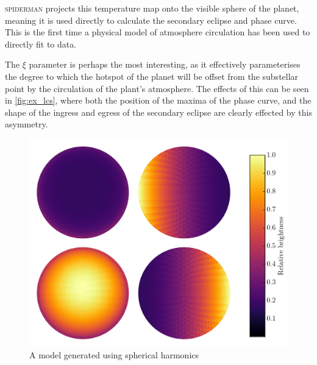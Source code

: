 \documentclass[a4paper,fleqn,usenatbib]{mnras}
\begin{document}
\textsc{spiderman} projects this temperature map onto the visible sphere of the planet, meaning it is used directly to calculate the secondary eclipse and phase curve. This is the first time a physical model of atmosphere circulation has been used to directly fit to data.

The $\xi$ parameter is perhaps the most interesting, as it effectively parameterises the degree to which the hotspot of the planet will be offset from the substellar point by the circulation of the plant's atmosphere. The effects of this can be seen in \ref{fig:ex_lcs}, where both the position of the maxima of the phase curve, and the shape of the ingress and egress of the secondary eclipse are clearly effected by this asymmetry.

\begin{figure}
\begin{center}
\includegraphics[width=\columnwidth]{img/sphere_quad.pdf}
\caption{A model generated using spherical harmonics}
\label{fig:harmonics}
\end{center}
\end{figure}
\end{document}
